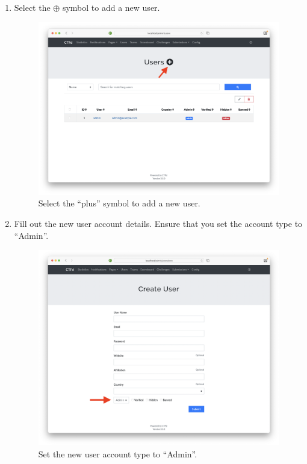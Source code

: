 \documentclass[11pt]{article}
\begin{document}
\begin{enumerate}
	\item Select the $\oplus$ symbol to add a new user.
	
	\begin{figure}[H]
		\centering
	   \includegraphics[width=\textwidth]{hit_plus_add_new_user.png}
  	   \caption{Select the ``plus'' symbol to add a new user.}
	\end{figure}

	\item Fill out the new user account details.
			Ensure that you set the account type to ``Admin''.
			
	\begin{figure}[H]
		\centering
	   \includegraphics[width=\textwidth]{create_admin_account.png}
  	   \caption{Set the new user account type to ``Admin''.}
	\end{figure}


\end{enumerate}
\end{document}
